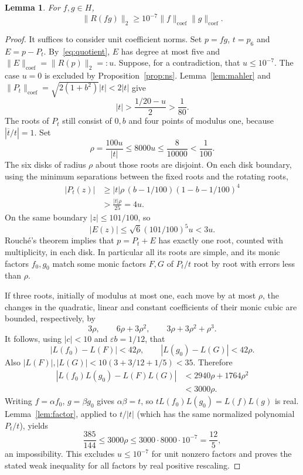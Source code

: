 \documentclass[11pt]{article}
\newtheorem{lemma}[theorem]{Lemma}
\theoremstyle{remark}\newtheorem{remark}[theorem]{Remark}
\newcommand{\coef}{\mathrm{coef}}
\begin{document}
\begin{lemma}\label{lem:coefstable}
For $f,g\in H$,
\[
 \|R(fg)\|_2\ge10^{-7}\|f\|_{\coef}\|g\|_{\coef}.
\]
\end{lemma}
\begin{proof}
It suffices to consider unit coefficient norms. Set $p=fg$, $t=p_6$ and $E=p-P_t$. By~\eqref{eq:quotient}, $E$ has degree at most five and
$\|E\|_{\coef}=\|R(p)\|_2=:u$. Suppose, for a contradiction, that $u\le10^{-7}$. The case $u=0$ is excluded by Proposition~\ref{prop:ns}. Lemma~\ref{lem:mahler} and
$\|P_t\|_{\coef}=\sqrt{2(1+b^2)}|t|<2|t|$ give
\[
 |t|>\frac{1/20-u}{2}>\frac1{80}.
\]
The roots of $P_t$ still consist of $0,b$ and four points of modulus one, because $|\overline t/t|=1$. Set
\[
 \rho=\frac{100u}{|t|}\le8000u\le\frac{8}{10000}<\frac1{100}.
\]
The six disks of radius $\rho$ about those roots are disjoint. On each disk boundary, using the minimum separations between the fixed roots and the rotating roots,
\begin{align*}
 |P_t(z)|&\ge |t|\rho\,(b-1/100)(1-b-1/100)^4\\
          &>\frac{|t|\rho}{25}=4u.
\end{align*}
On the same boundary $|z|\le101/100$, so
\[
 |E(z)|\le\sqrt6(101/100)^5u<3u.
\]
Rouch\'e's theorem implies that $p=P_t+E$ has exactly one root, counted with multiplicity, in each disk. In particular all its roots are simple, and its monic factors $f_0,g_0$ match some monic factors $F,G$ of $P_t/t$ root by root with errors less than $\rho$.

If three roots, initially of modulus at most one, each move by at most $\rho$, the changes in the quadratic, linear and constant coefficients of their monic cubic are bounded, respectively, by
\[
 3\rho,\qquad 6\rho+3\rho^2,\qquad
 3\rho+3\rho^2+\rho^3.
\]
It follows, using $|c|<10$ and $\varepsilon b=1/12$, that
\[
 |L(f_0)-L(F)|<42\rho,\qquad
 |L(g_0)-L(G)|<42\rho.
\]
Also $|L(F)|,|L(G)|<10(3+3/12+1/5)<35$. Therefore
\begin{align*}
 |L(f_0)L(g_0)-L(F)L(G)|
 &<2940\rho+1764\rho^2\\
 &<3000\rho.
\end{align*}
Writing $f=\alpha f_0$, $g=\beta g_0$ gives $\alpha\beta=t$, so $tL(f_0)L(g_0)=L(f)L(g)$ is real. Lemma~\ref{lem:factor}, applied to $t/|t|$ (which has the same normalized polynomial $P_t/t$), yields
\[
 \frac{385}{144}\le3000\rho\le 3000\cdot8000\cdot10^{-7}
 =\frac{12}{5},
\]
an impossibility. This excludes $u\le10^{-7}$ for unit nonzero factors and proves the stated weak inequality for all factors by real positive rescaling.
\end{proof}
\end{document}
